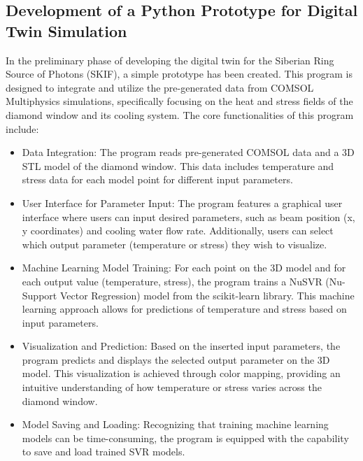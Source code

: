 \subsection{Development of a Python Prototype for Digital Twin Simulation}

In the preliminary phase of developing the digital twin for the Siberian Ring
Source of Photons (SKIF), a simple prototype has been created. This
program is designed to integrate and utilize the pre-generated data from COMSOL
Multiphysics simulations, specifically focusing on the heat and stress fields
of the diamond window and its cooling system. The core functionalities of this
program include:

\begin{itemize}

  \item Data Integration: The program reads pre-generated COMSOL data and a 3D
    STL model of the diamond window. This data includes temperature and stress
    data for each model point for different input parameters.

  \item User Interface for Parameter Input: The program features a graphical
    user interface where users can input desired parameters, such as beam
    position (x, y coordinates) and cooling water flow rate. Additionally,
    users can select which output parameter (temperature or stress) they wish
    to visualize.

  \item Machine Learning Model Training: For each point on the 3D model and for
    each output value (temperature, stress), the program trains a NuSVR
    (Nu-Support Vector Regression) model from the scikit-learn library. This
    machine learning approach allows for predictions of temperature and stress
    based on input parameters.

  \item Visualization and Prediction: Based on the inserted input parameters,
    the program predicts and displays the selected output parameter on the 3D
    model. This visualization is achieved through color mapping, providing an
    intuitive understanding of how temperature or stress varies across the
    diamond window.

  \item Model Saving and Loading: Recognizing that training machine learning
    models can be time-consuming, the program is equipped with the capability
    to save and load trained SVR models. 

\end{itemize}

